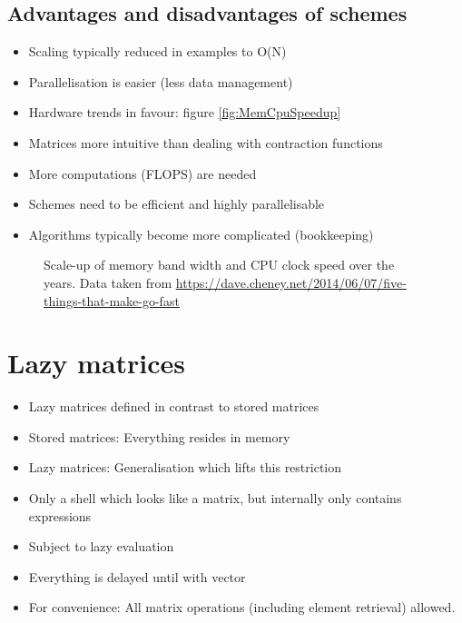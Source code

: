 \subsection{Advantages and disadvantages of \contraction schemes}
\begin{itemize}
	\item Scaling typically reduced in examples to O(N)
	\item Parallelisation is easier (less data management)
	\item Hardware trends in favour: figure \vref{fig:MemCpuSpeedup}
	\item Matrices more intuitive than dealing with contraction functions
	\item More computations (FLOPS) are needed
	\item Schemes need to be efficient and highly parallelisable
	\item Algorithms typically become more complicated (bookkeeping)
\end{itemize}


\begin{figure}
	\centering
	\caption{Scale-up of memory band width and CPU clock speed over the years.
	Data taken from \url{https://dave.cheney.net/2014/06/07/five-things-that-make-go-fast}
	}
	\label{fig:MemCpuSpeedup}
\end{figure}


\section{Lazy matrices}

\begin{itemize}
	\item Lazy matrices defined in contrast to stored matrices
	\item Stored matrices: Everything resides in memory
	\item Lazy matrices: Generalisation which lifts this restriction
	\item Only a shell which looks like a matrix, but internally only contains expressions
	\item Subject to lazy evaluation
	\item Everything is delayed until \contraction with vector
	\item For convenience: All matrix operations (including element retrieval) allowed.
\end{itemize}

